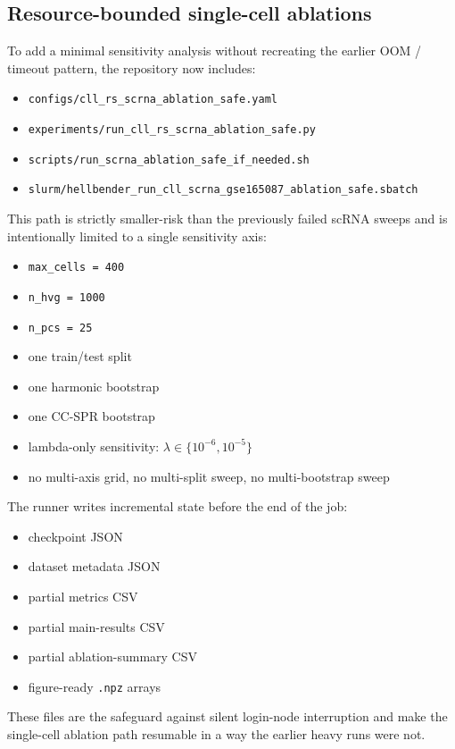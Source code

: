 \documentclass[11pt]{article}
\begin{document}
\subsection{Resource-bounded single-cell ablations}
To add a minimal sensitivity analysis without recreating the earlier OOM / timeout pattern, the repository now includes:
\begin{itemize}[leftmargin=1.5em]
\item \texttt{configs/cll\_rs\_scrna\_ablation\_safe.yaml}
\item \texttt{experiments/run\_cll\_rs\_scrna\_ablation\_safe.py}
\item \texttt{scripts/run\_scrna\_ablation\_safe\_if\_needed.sh}
\item \texttt{slurm/hellbender\_run\_cll\_scrna\_gse165087\_ablation\_safe.sbatch}
\end{itemize}

This path is strictly smaller-risk than the previously failed scRNA sweeps and is intentionally limited to a single sensitivity axis:
\begin{itemize}[leftmargin=1.5em]
\item \texttt{max\_cells = 400}
\item \texttt{n\_hvg = 1000}
\item \texttt{n\_pcs = 25}
\item one train/test split
\item one harmonic bootstrap
\item one CC-SPR bootstrap
\item lambda-only sensitivity: $\lambda \in \{10^{-6}, 10^{-5}\}$
\item no multi-axis grid, no multi-split sweep, no multi-bootstrap sweep
\end{itemize}

The runner writes incremental state before the end of the job:
\begin{itemize}[leftmargin=1.5em]
\item checkpoint JSON
\item dataset metadata JSON
\item partial metrics CSV
\item partial main-results CSV
\item partial ablation-summary CSV
\item figure-ready \texttt{.npz} arrays
\end{itemize}
These files are the safeguard against silent login-node interruption and make the single-cell ablation path resumable in a way the earlier heavy runs were not.
\end{document}
